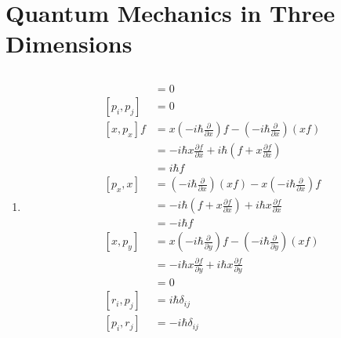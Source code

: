 \documentclass{article}
\begin{document}
\section{Quantum Mechanics in Three Dimensions}

\subsection{}

\begin{enumerate}
  \item

        \begin{align*}
          [r_i, r_j] & = 0                                                                                                                   \\
          [p_i, p_j] & = 0                                                                                                                   \\
          [x, p_x] f & = x \left( -i \hbar \frac{\partial}{\partial x} \right) f - \left( -i \hbar \frac{\partial}{\partial x} \right) (x f) \\
                     & = -i \hbar x \frac{\partial f}{\partial x} + i \hbar \left( f + x \frac{\partial f}{\partial x} \right)               \\
                     & = i \hbar f                                                                                                           \\
          [p_x, x]   & = \left( -i \hbar \frac{\partial}{\partial x} \right) (x f) - x \left( -i \hbar \frac{\partial}{\partial x} \right) f \\
                     & = -i \hbar \left( f + x \frac{\partial f}{\partial x} \right) + i \hbar x \frac{\partial f}{\partial x}               \\
                     & = -i \hbar f                                                                                                          \\
          [x, p_y]   & = x \left( -i \hbar \frac{\partial}{\partial y} \right) f - \left( -i \hbar \frac{\partial}{\partial y} \right) (x f) \\
                     & = -i \hbar x \frac{\partial f}{\partial y} + i \hbar x \frac{\partial f}{\partial y}                                  \\
                     & = 0                                                                                                                   \\
          [r_i, p_j] & = i \hbar \delta_{i j}                                                                                                \\
          [p_i, r_j] & = -i \hbar \delta_{i j}
        \end{align*}


\end{enumerate}
\end{document}
